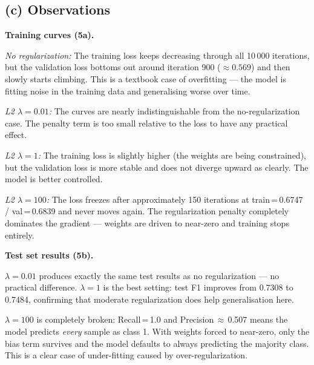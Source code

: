 \documentclass[11pt,a4paper]{article}
\begin{document}
\subsection{(c) Observations}

\textbf{Training curves (5a).}

\textit{No regularization:} The training loss keeps decreasing through all 10\,000 iterations, but the validation loss bottoms out around iteration 900 ($\approx 0.569$) and then slowly starts climbing. This is a textbook case of overfitting --- the model is fitting noise in the training data and generalising worse over time.

\textit{L2 $\lambda = 0.01$:} The curves are nearly indistinguishable from the no-regularization case. The penalty term is too small relative to the loss to have any practical effect.

\textit{L2 $\lambda = 1$:} The training loss is slightly higher (the weights are being constrained), but the validation loss is more stable and does not diverge upward as clearly. The model is better controlled.

\textit{L2 $\lambda = 100$:} The loss freezes after approximately 150 iterations at train\,=\,0.6747 / val\,=\,0.6839 and never moves again. The regularization penalty completely dominates the gradient --- weights are driven to near-zero and training stops entirely.

\textbf{Test set results (5b).}

$\lambda = 0.01$ produces exactly the same test results as no regularization --- no practical difference. $\lambda = 1$ is the best setting: test F1 improves from 0.7308 to 0.7484, confirming that moderate regularization does help generalisation here.

$\lambda = 100$ is completely broken: Recall\,=\,1.0 and Precision\,$\approx$\,0.507 means the model predicts \textit{every} sample as class 1. With weights forced to near-zero, only the bias term survives and the model defaults to always predicting the majority class. This is a clear case of under-fitting caused by over-regularization.
\end{document}
